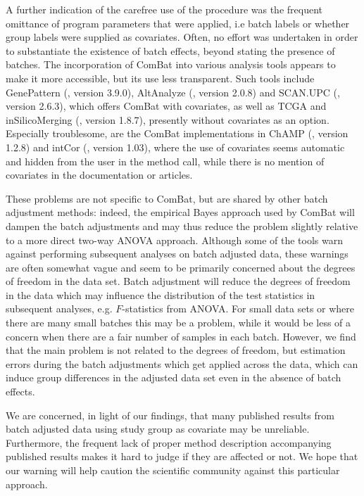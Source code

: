 \documentclass{bio}
\begin{document}
A further indication of the carefree use of the procedure was the frequent omittance of program parameters that were applied, i.e batch labels or whether group labels were supplied as covariates. Often, no effort was undertaken in order to substantiate the existence of batch effects, beyond stating the presence of batches. The incorporation of ComBat into various analysis tools appears to make it more accessible, but its use less transparent. Such tools include GenePattern (\citealp{Reich2006}, version 3.9.0), AltAnalyze (\citealp{Emig2010}, version 2.0.8) and SCAN.UPC (\citealp{Piccolo2013}, version 2.6.3), which offers ComBat with covariates, as well as TCGA and  inSilicoMerging (\citealp{ Taminau2012}, version 1.8.7), presently without covariates as an option. Especially troublesome, are the ComBat implementations in ChAMP (\citealp{Morris2014}, version 1.2.8) and intCor (\citealp{Fernandez-Albert2014}, version 1.03), where the use of covariates seems automatic and hidden from the user in the method call, while there is no mention of covariates in the documentation or articles.

These problems are not specific to ComBat, but are shared by other batch adjustment methods: indeed, the empirical Bayes approach used by ComBat  will dampen the batch adjustments and may thus reduce the problem slightly relative to a more direct two-way ANOVA approach. Although some of the tools warn against performing subsequent analyses on batch adjusted data, these warnings are often somewhat vague and seem to be primarily concerned about the degrees of freedom in the data set. Batch adjustment will reduce the degrees of freedom in the data which may influence the distribution of the test statistics in subsequent analyses, e.g. $F$-statistics from ANOVA. For small data sets or where there are many small batches this may be a problem, while it would be less of a concern when there are a fair number of samples in each batch. However, we find that the main problem is not related to the degrees of freedom, but estimation errors during the batch adjustments which get applied across the data, which can induce group differences in the adjusted data set even in the absence of batch effects.

We are concerned, in light of our findings, that many published results from batch adjusted data using study group as covariate may be unreliable. Furthermore, the frequent lack of proper method description accompanying published results makes it hard to judge if they are affected or not. We hope that our warning will help caution the scientific community against this particular approach.
\end{document}
